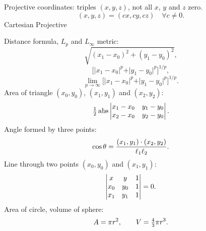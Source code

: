 Projective coordinates: triples $(x,y,z)$,
not all $x$, $y$ and $z$ zero.
$$(x,y,z) = (cx,cy,cz) \quad \forall c \neq 0.$$
Cartesian \qquad Projective
\Hrule
{}

Distance formula, $L_p$ and $L_\infty$ metric:
$$
\sqrt{(x_1 - x_0)^2 + (y_1 - y_0)^2},
$$
$$
\big[ \vert x_1 - x_0 \vert^p + \vert y_1 - y_0 \vert^p \big]^{1/p},
$$
$$
\lim_{p \to \infty} \big[ \vert x_1 - x_0 \vert^p + \vert y_1 - y_0 \vert^p \big]^{1/p}.
$$
Area of triangle $(x_0,y_0)$, $(x_1,y_1)$ and $(x_2,y_2)$:
$$
\sfrac 1 2
\abs
\left\vert \begin{matrix}
x_1-x_0 &y_1-y_0  \cr
x_2-x_0 &y_2-y_0  \cr
\end{matrix}\right\vert.
$$
Angle formed by three points:
\vskip3pt
$$
\cos \theta = {(x_1, y_1) \cdot (x_2, y_2) \over \ell_1 \ell_2}.
$$
Line through two points $(x_0,y_0)$ and $(x_1,y_1)$:
$$
\left\vert \begin{matrix}
x &y & 1\cr
x_0 &y_0 & 1\cr
x_1 &y_1 & 1\cr
\end{matrix}\right\vert = 0.
$$
Area of circle, volume of sphere:
$$ A= \pi r^2, \qquad V= \sfrac 4 3 \pi r^3.$$
